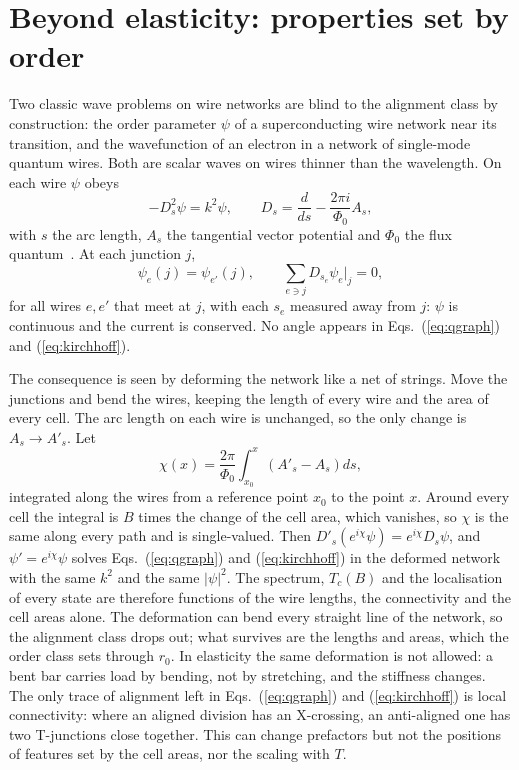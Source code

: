 \documentclass[aps,prl,onecolumn,superscriptaddress,amsmath,amssymb,floatfix]{revtex4-2}
\begin{document}
\section{Beyond elasticity: properties set by order}\label{sec:negative}

Two classic wave problems on wire networks are blind to
the alignment class by construction: the order parameter $\psi$ of a superconducting wire network
near its transition, and the wavefunction of an electron in a network of single-mode quantum
wires. Both are scalar waves on wires thinner than the wavelength. On each wire $\psi$ obeys
\begin{equation}
-D_s^{2}\psi=k^{2}\psi ,\qquad D_s=\frac{d}{ds}-\frac{2\pi i}{\Phi_0}A_s ,
\label{eq:qgraph}
\end{equation}
with $s$ the arc length, $A_s$ the tangential vector potential and $\Phi_0$ the flux
quantum~\cite{degennes1981,alexander1983}. At each junction $j$,
\begin{equation}
\psi_e(j)=\psi_{e'}(j),\qquad \sum_{e\ni j}D_{s_e}\psi_e\big|_j=0 ,
\label{eq:kirchhoff}
\end{equation}
for all wires $e,e'$ that meet at $j$, with each $s_e$ measured away from $j$: $\psi$ is
continuous and the current is conserved. No angle appears in Eqs.~(\ref{eq:qgraph}) and
(\ref{eq:kirchhoff}).

The consequence is seen by deforming the network like a net of strings. Move the junctions and
bend the wires, keeping the length of every wire and the area of every cell. The arc length on
each wire is unchanged, so the only change is $A_s\to A'_s$. Let
\begin{equation}
\chi(x)=\frac{2\pi}{\Phi_0}\int_{x_0}^{x}\left(A'_s-A_s\right)ds ,
\label{eq:bend}
\end{equation}
integrated along the wires from a reference point $x_0$ to the point $x$. Around every cell the
integral is $B$ times the change of the cell area, which vanishes, so $\chi$ is the same along
every path and is single-valued. Then $D'_s(e^{i\chi}\psi)=e^{i\chi}D_s\psi$, and
$\psi'=e^{i\chi}\psi$ solves Eqs.~(\ref{eq:qgraph}) and (\ref{eq:kirchhoff}) in the deformed
network with the same $k^2$ and the same $|\psi|^2$. The spectrum, $T_c(B)$ and the localisation
of every state are therefore functions of the wire lengths, the connectivity and the cell areas
alone. The deformation can bend every straight line of the network, so the alignment class
drops out; what survives are the lengths and areas, which the order class sets through $r_0$.
In elasticity the same deformation is not allowed: a bent bar carries load by bending, not by
stretching, and the stiffness changes. The only trace of alignment left in
Eqs.~(\ref{eq:qgraph}) and (\ref{eq:kirchhoff}) is local connectivity: where an aligned division
has an X-crossing, an anti-aligned one has two T-junctions close together. This can change
prefactors but not the positions of features set by the cell areas, nor the scaling with $T$.




\end{document}
